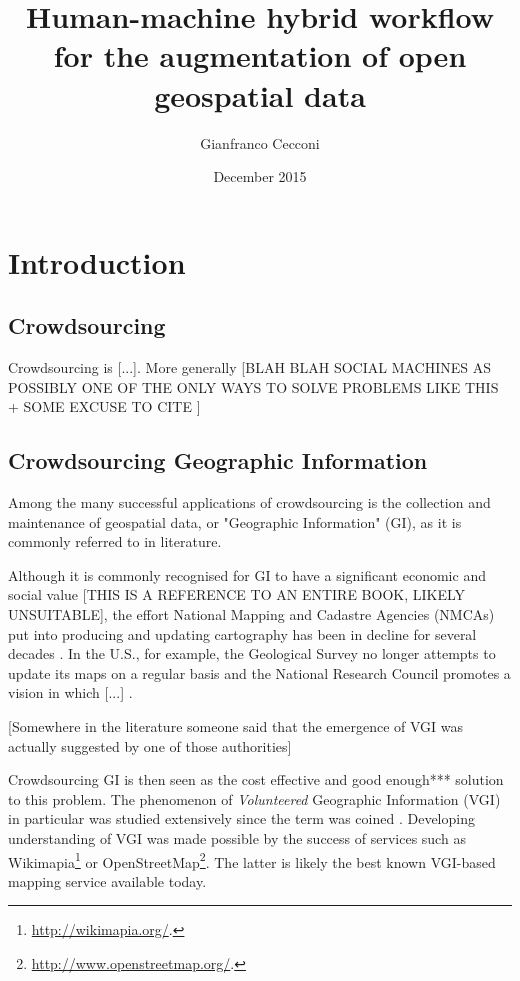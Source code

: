 \documentclass{llncs}
\title{Human-machine hybrid workflow for the augmentation of open geospatial data}
\author{Gianfranco Cecconi}
\institute{University of Southampton \email{gc1a13@soton.ac.uk}}
\date{December 2015}
\begin{document}
\maketitle

\section{Introduction}

\subsection{Crowdsourcing}

Crowdsourcing is {[}...{]}. More generally {[}BLAH BLAH SOCIAL MACHINES AS POSSIBLY ONE OF THE ONLY WAYS TO SOLVE PROBLEMS LIKE THIS + SOME EXCUSE TO CITE \cite{OReilly:2015uo}{]}

\subsection{Crowdsourcing Geographic Information}

Among the many successful applications of crowdsourcing is the collection and maintenance of geospatial data, or "Geographic Information" (GI), as it is commonly referred to in literature.

Although it is commonly recognised for GI to have a significant economic and social value \cite{Sui:2012uf}[THIS IS A REFERENCE TO AN ENTIRE BOOK, LIKELY UNSUITABLE], the effort National Mapping and Cadastre Agencies (NMCAs) put into producing and updating cartography has been in decline for several decades \cite{ESTES:1994vz}. In the U.S., for example, the Geological Survey no longer attempts to update its maps on a regular basis and the National Research Council promotes a vision in which {[}...{]} \cite{Committee:1993vp}.

{[}Somewhere in the literature someone said that the emergence of VGI was actually suggested by one of those authorities{]}

Crowdsourcing GI is then seen as the cost effective and good enough*** solution to this problem. The phenomenon of {\it Volunteered} Geographic Information (VGI) in particular was studied extensively since the term was coined \cite{Goodchild:2007vt}. Developing understanding of VGI was made possible by the success of services such as Wikimapia\footnote{\url{http://wikimapia.org/}.} or OpenStreetMap\footnote{\url{http://www.openstreetmap.org/}.}. The latter is likely the best known VGI-based mapping service available today.
\end{document}
